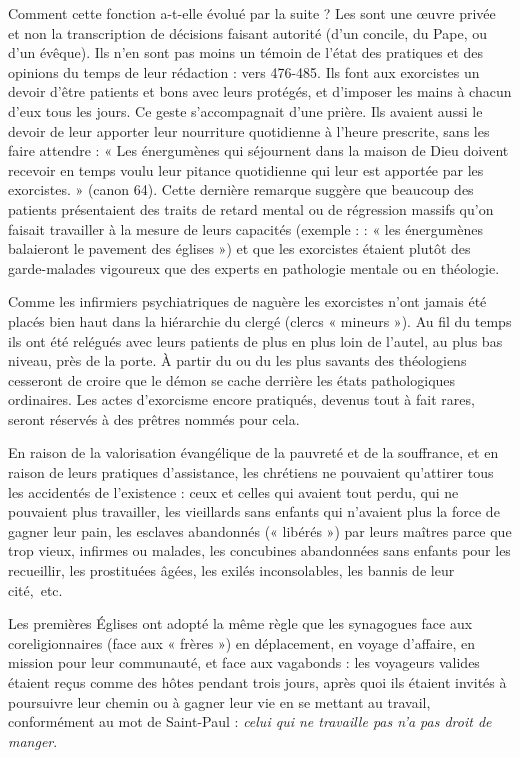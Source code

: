  Comment cette fonction a-t-elle évolué par la suite ? Les  sont une œuvre privée et non la transcription de décisions faisant autorité (d'un concile, du Pape, ou d'un évêque). Ils n'en sont pas moins un témoin de l'état des pratiques et des opinions du temps de leur rédaction : vers 476-485. Ils font aux exorcistes un devoir d'être patients et bons avec leurs protégés, et d'imposer les mains à chacun d'eux tous les jours. Ce geste s'accompagnait d'une prière. Ils avaient aussi le devoir de leur apporter leur nourriture quotidienne à l'heure prescrite, sans les faire attendre : « Les énergumènes qui séjournent dans la maison de Dieu doivent recevoir en temps voulu leur pitance quotidienne qui leur est apportée par les exorcistes. » (canon 64). Cette dernière remarque suggère que beaucoup des patients présentaient des traits de retard mental ou de régression massifs qu'on faisait travailler à la mesure de leurs capacités (exemple :  : « les énergumènes balaieront le pavement des églises ») et que les exorcistes étaient plutôt des garde-malades vigoureux que des experts en pathologie mentale ou en théologie. 

 Comme les infirmiers psychiatriques de naguère les exorcistes n'ont jamais été placés bien haut dans la hiérarchie du clergé (clercs « mineurs »). Au fil du temps ils ont été relégués avec leurs patients de plus en plus loin de l'autel, au plus bas niveau, près de la porte. À partir du  ou du  les plus savants des théologiens cesseront de croire que le démon se cache derrière les états pathologiques ordinaires. Les actes d'exorcisme encore pratiqués, devenus tout à fait rares, seront réservés à des prêtres nommés pour cela. 



En raison de la valorisation évangélique de la pauvreté et de la souffrance, et en raison de leurs pratiques d'assistance, les chrétiens ne pouvaient qu'attirer tous les accidentés de l'existence : ceux et celles qui avaient tout perdu, qui ne pouvaient plus travailler, les vieillards sans enfants qui n'avaient plus la force de gagner leur pain, les esclaves abandonnés (« libérés ») par leurs maîtres parce que trop vieux, infirmes ou malades, les concubines abandonnées sans enfants pour les recueillir, les prostituées âgées, les exilés inconsolables, les bannis de leur cité,~etc. 

 Les premières Églises ont adopté la même règle que les synagogues face aux coreligionnaires (face aux « frères ») en déplacement, en voyage d'affaire, en mission pour leur communauté, et face aux vagabonds : les voyageurs valides étaient reçus comme des hôtes pendant trois jours, après quoi ils étaient invités à poursuivre leur chemin ou à gagner leur vie en se mettant au travail, conformément au mot de Saint-Paul : \emph{celui qui ne travaille pas n'a pas droit de manger}. 

